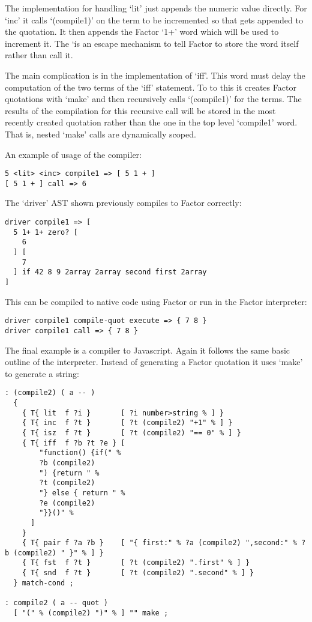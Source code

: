 The implementation for handling `lit' just appends the numeric value
directly. For `inc' it calls `(compile1)' on the term to be
incremented so that gets appended to the quotation. It then appends
the Factor `1+' word which will be used to increment it. The `\' is an
escape mechanism to tell Factor to store the word itself rather than
call it.

The main complication is in the implementation of `iff'. This word
must delay the computation of the two terms of the `iff' statement. To
to this it creates Factor quotations with `make' and then recursively
calls `(compile1)' for the terms. The results of the compilation for
this recursive call will be stored in the most recently created
quotation rather than the one in the top level `compile1' word. That
is, nested `make' calls are dynamically scoped.

An example of usage of the compiler:

\begin{verbatim}
5 <lit> <inc> compile1 => [ 5 1 + ] 
[ 5 1 + ] call => 6
\end{verbatim}

The `driver' AST shown previously compiles to Factor correctly:

\begin{verbatim}
driver compile1 => [
  5 1+ 1+ zero? [
    6
  ] [ 
    7
  ] if 42 8 9 2array 2array second first 2array
]
\end{verbatim}

This can be compiled to native code using Factor or run in the Factor
interpreter:

\begin{verbatim}
driver compile1 compile-quot execute => { 7 8 }
driver compile1 call => { 7 8 }
\end{verbatim}

The final example is a compiler to Javascript. Again it follows the
same basic outline of the interpreter. Instead of generating a Factor
quotation it uses `make' to generate a string:

\begin{verbatim}
: (compile2) ( a -- )
  {
    { T{ lit  f ?i }       [ ?i number>string % ] }
    { T{ inc  f ?t }       [ ?t (compile2) "+1" % ] }
    { T{ isz  f ?t }       [ ?t (compile2) "== 0" % ] }
    { T{ iff  f ?b ?t ?e } [ 
        "function() {if(" % 
        ?b (compile2) 
        ") {return " % 
        ?t (compile2)
        "} else { return " %
        ?e (compile2)
        "}}()" %
      ] 
    }
    { T{ pair f ?a ?b }    [ "{ first:" % ?a (compile2) ",second:" % ?b (compile2) " }" % ] }
    { T{ fst  f ?t }       [ ?t (compile2) ".first" % ] }
    { T{ snd  f ?t }       [ ?t (compile2) ".second" % ] }
  } match-cond ;  

: compile2 ( a -- quot )
  [ "(" % (compile2) ")" % ] "" make ;
\end{verbatim}

